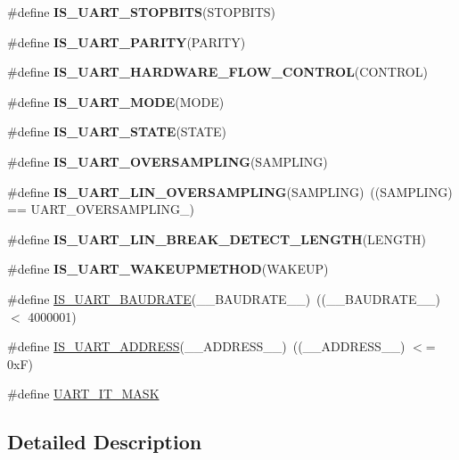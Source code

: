 \begin{DoxyCompactItemize}
\item 
\#define {\bfseries I\-S\-\_\-\-U\-A\-R\-T\-\_\-\-S\-T\-O\-P\-B\-I\-T\-S}(S\-T\-O\-P\-B\-I\-T\-S)
\item 
\#define {\bfseries I\-S\-\_\-\-U\-A\-R\-T\-\_\-\-P\-A\-R\-I\-T\-Y}(P\-A\-R\-I\-T\-Y)
\item 
\#define {\bfseries I\-S\-\_\-\-U\-A\-R\-T\-\_\-\-H\-A\-R\-D\-W\-A\-R\-E\-\_\-\-F\-L\-O\-W\-\_\-\-C\-O\-N\-T\-R\-O\-L}(C\-O\-N\-T\-R\-O\-L)
\item 
\#define {\bfseries I\-S\-\_\-\-U\-A\-R\-T\-\_\-\-M\-O\-D\-E}(M\-O\-D\-E)
\item 
\#define {\bfseries I\-S\-\_\-\-U\-A\-R\-T\-\_\-\-S\-T\-A\-T\-E}(S\-T\-A\-T\-E)
\item 
\#define {\bfseries I\-S\-\_\-\-U\-A\-R\-T\-\_\-\-O\-V\-E\-R\-S\-A\-M\-P\-L\-I\-N\-G}(S\-A\-M\-P\-L\-I\-N\-G)
\item 
\hypertarget{group___u_a_r_t___private___macros_gacd5577cca731f8ef51badd665f6aa5e6}{\#define {\bfseries I\-S\-\_\-\-U\-A\-R\-T\-\_\-\-L\-I\-N\-\_\-\-O\-V\-E\-R\-S\-A\-M\-P\-L\-I\-N\-G}(S\-A\-M\-P\-L\-I\-N\-G)~((S\-A\-M\-P\-L\-I\-N\-G) == U\-A\-R\-T\-\_\-\-O\-V\-E\-R\-S\-A\-M\-P\-L\-I\-N\-G\-\_)}\label{group___u_a_r_t___private___macros_gacd5577cca731f8ef51badd665f6aa5e6}

\item 
\#define {\bfseries I\-S\-\_\-\-U\-A\-R\-T\-\_\-\-L\-I\-N\-\_\-\-B\-R\-E\-A\-K\-\_\-\-D\-E\-T\-E\-C\-T\-\_\-\-L\-E\-N\-G\-T\-H}(L\-E\-N\-G\-T\-H)
\item 
\#define {\bfseries I\-S\-\_\-\-U\-A\-R\-T\-\_\-\-W\-A\-K\-E\-U\-P\-M\-E\-T\-H\-O\-D}(W\-A\-K\-E\-U\-P)
\item 
\#define \hyperlink{group___u_a_r_t___private___macros_gaa8f50c3cc4c04875ea490fb81a08731d}{I\-S\-\_\-\-U\-A\-R\-T\-\_\-\-B\-A\-U\-D\-R\-A\-T\-E}(\-\_\-\-\_\-\-B\-A\-U\-D\-R\-A\-T\-E\-\_\-\-\_\-)~((\-\_\-\-\_\-\-B\-A\-U\-D\-R\-A\-T\-E\-\_\-\-\_\-) $<$ 4000001)
\item 
\#define \hyperlink{group___u_a_r_t___private___macros_ga978f0c8e5eee3322a60700ffafc835ec}{I\-S\-\_\-\-U\-A\-R\-T\-\_\-\-A\-D\-D\-R\-E\-S\-S}(\-\_\-\-\_\-\-A\-D\-D\-R\-E\-S\-S\-\_\-\-\_\-)~((\-\_\-\-\_\-\-A\-D\-D\-R\-E\-S\-S\-\_\-\-\_\-) $<$= 0x\-F)
\item 
\#define \hyperlink{group___u_a_r_t___private___macros_ga869439269c26e8dee93d49b1c7e67448}{U\-A\-R\-T\-\_\-\-I\-T\-\_\-\-M\-A\-S\-K}
\end{DoxyCompactItemize}


\subsection{Detailed Description}


